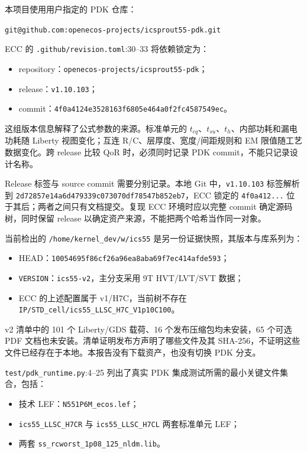 \documentclass[UTF8,a4paper,11pt,fontset=fandol]{ctexart}
\numberwithin{equation}{section}
\newcommand{\code}[1]{\nolinkurl{#1}}
\begin{document}
本项目使用用户指定的 PDK 仓库：
\begin{center}
\code{git@github.com:openecos-projects/icsprout55-pdk.git}
\end{center}

ECC 的 \code{.github/revision.toml}:30--33 将依赖锁定为：
\begin{itemize}
  \item repository：\code{openecos-projects/icsprout55-pdk}；
  \item release：\code{v1.10.103}；
  \item commit：\code{4f0a4124e3528163f6805e464a0f2fc4587549ec}。
\end{itemize}

这组版本信息解释了公式参数的来源。标准单元的 $t_{cq}$、$t_{su}$、$t_h$、内部功耗和漏电功耗随 Liberty 视图变化；互连 R/C、层厚度、宽度/间距规则和 EM 限值随工艺数据变化。跨 release 比较 QoR 时，必须同时记录 PDK commit，不能只记录设计名称。

Release 标签与 source commit 需要分别记录。本地 Git 中，\code{v1.10.103} 标签解析到 \code{2d72857e14a6d479339c073070df78547b852eb7}，ECC 锁定的 \code{4f0a412...} 位于其后；两者之间只有文档提交。复现 ECC 环境时应以完整 commit 确定源码树，同时保留 release 以确定资产来源，不能把两个哈希当作同一对象。

当前检出的 \code{/home/kernel_dev/w/ics55} 是另一份证据快照，其版本与库系列为：
\begin{itemize}
  \item HEAD：\code{10054695f86cf26a96ea8aba69f7ec414afde593}；
  \item \code{VERSION}：\code{ics55-v2}，主分支采用 9T HVT/LVT/SVT 数据；
  \item ECC 的上述配置属于 v1/H7C，当前树不存在 \code{IP/STD_cell/ics55_LLSC_H7C_V1p10C100}。
\end{itemize}
v2 清单中的 101 个 Liberty/GDS 载荷、16 个发布压缩包均未安装，65 个可选 PDF 文档也未安装。清单证明发布方声明了哪些文件及其 SHA-256，不证明这些文件已经存在于本地。本报告没有下载资产，也没有切换 PDK 分支。

\code{test/pdk_runtime.py}:4--25 列出了真实 PDK 集成测试所需的最小关键文件集合，包括：
\begin{itemize}
  \item 技术 LEF：\code{N551P6M_ecos.lef}；
  \item \code{ics55_LLSC_H7CR} 与 \code{ics55_LLSC_H7CL} 两套标准单元 LEF；
  \item 两套 \code{ss_rcworst_1p08_125_nldm.lib}。
\end{itemize}
\end{document}
